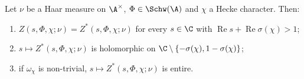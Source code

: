 Let $\nu$ be a Haar measure on $\A^\times$, $\Phi\in\Schw(\A)$ and $\chi$ a Hecke character. Then:
\begin{enumerate}
\item $Z(s,\Phi,\chi;\nu)=Z^*(s,\Phi,\chi;\nu)$ for every $s\in\C$ with $\operatorname{Re}s+\operatorname{Re}\sigma(\chi)>1$;
\item $s\mapsto Z^*(s,\Phi,\chi;\nu)$ is holomorphic on $\C\setminus\{-\sigma(\chi),1-\sigma(\chi)\}$;
\item if $\omega_\chi$ is non-trivial, $s\mapsto Z^*(s,\Phi,\chi;\nu)$ is entire.
\end{enumerate}
